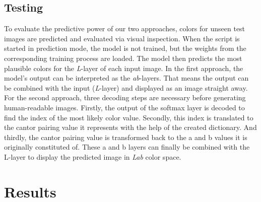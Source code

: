 \documentclass[12pt,letterpaper]{article}
\begin{document}
\subsection{Testing}
To evaluate the predictive power of our two approaches, colors for unseen test images are predicted and evaluated via visual inspection. When the script is started in prediction mode, the model is not trained, but the weights from the corresponding training process are loaded. The model then predicts the most plausible colors for the \emph{L}-layer of each input image.
In the first approach, the model's output can be interpreted as the \emph{ab}-layers. That means the output can be combined with the input (\emph{L}-layer) and displayed as an image straight away.
For the second approach, three decoding steps are necessary before generating human-readable images. Firstly, the output of the softmax layer is decoded to find the index of the most likely color value. Secondly, this index is translated to the cantor pairing value it represents with the help of the created dictionary. And thirdly, the cantor pairing value is transformed back to the a and b values it is originally constituted of. These a and b layers can finally be combined with the L-layer to display the predicted image in \emph{Lab} color space.
\section{Results}
\end{document}

